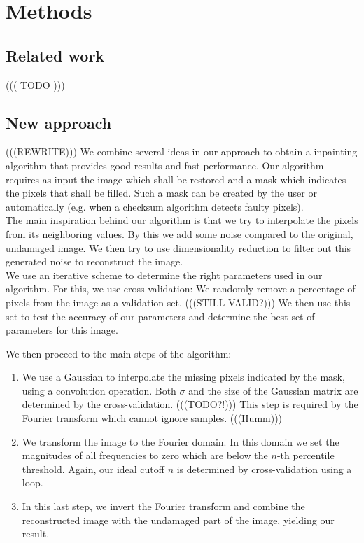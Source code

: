 \documentclass[10pt,conference,compsocconf]{IEEEtran}
\begin{document}
\section{Methods}
\subsection{Related work}
((( TODO )))

\subsection{New approach}
(((REWRITE)))
We combine several ideas in our approach to obtain a inpainting algorithm that provides good results and fast performance.
Our algorithm requires as input the image which shall be restored and a mask which indicates the pixels that shall be filled. Such a mask can be created by the user or automatically (e.g. when a checksum algorithm detects faulty pixels).\\
The main inspiration behind our algorithm is that we try to interpolate the pixels from its neighboring values. By this we add some noise compared to the original, undamaged image. We then try to use dimensionality reduction to filter out this generated noise to reconstruct the image.\\

We use an iterative scheme to determine the right parameters used in our algorithm. For this, we use cross-validation: We randomly remove a percentage of pixels from the image as a validation set. (((STILL VALID?))) We then use this set to test the accuracy of our parameters and determine the best set of parameters for this image.

We then proceed to the main steps of the algorithm:
\begin{enumerate}
\label{algo}
\item \label{algo:step1}
We use a Gaussian to interpolate the missing pixels indicated by the mask, using a convolution operation. Both $\sigma$ and the size of the Gaussian matrix are determined by the cross-validation. (((TODO?!)))
This step is required by the Fourier transform which cannot ignore samples. (((Humm)))

\item \label{algo:step2}
We transform the image to the Fourier domain. In this domain we set the magnitudes of all frequencies to zero which are below the $n$-th percentile threshold. Again, our ideal cutoff $n$ is determined by cross-validation using a loop.

\item \label{algo:step3}
In this last step, we invert the Fourier transform and combine the reconstructed image with the undamaged part of the image, yielding our result.

\end{enumerate}
\end{document}
